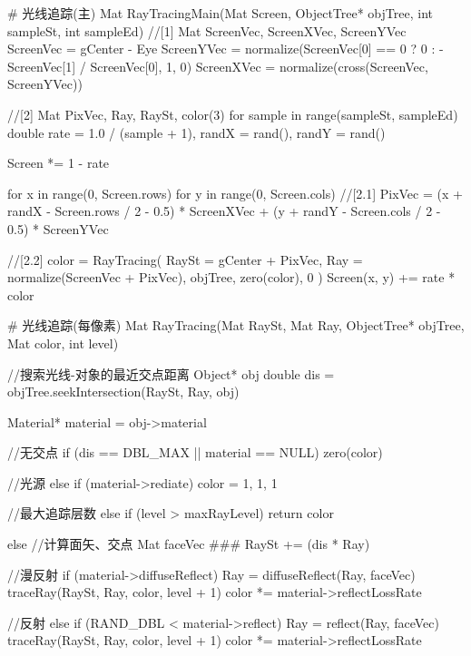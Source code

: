 						\Codes
							# 光线追踪(主)
							Mat RayTracingMain(Mat Screen, ObjectTree* objTree, int sampleSt, int sampleEd)
								//[1]
								Mat ScreenVec, ScreenXVec, ScreenYVec
								ScreenVec = gCenter - Eye
								ScreenYVec = normalize({ScreenVec[0] == 0 ? 0 : -ScreenVec[1] / ScreenVec[0], 1, 0})
								ScreenXVec = normalize(cross(ScreenVec, ScreenYVec))

								//[2]
								Mat PixVec, Ray, RaySt, color(3)
								for sample in range(sampleSt, sampleEd)
									double rate = 1.0 / (sample + 1), randX = rand(), randY = rand()

									Screen *= 1 - rate

									for x in range(0, Screen.rows)
										for y in range(0, Screen.cols)
											//[2.1]
											PixVec 
												= (x + randX - Screen.rows / 2 - 0.5) * ScreenXVec 
												+ (y + randY - Screen.cols / 2 - 0.5) * ScreenYVec

											//[2.2]
											color = RayTracing(
												RaySt = gCenter + PixVec, 
												Ray = normalize(ScreenVec + PixVec), 
												objTree, zero(color), 0
											) 
											Screen(x, y) += rate * color

							# 光线追踪(每像素)
							Mat RayTracing(Mat RaySt, Mat Ray, ObjectTree* objTree, Mat color, int level) 

								//搜索光线-对象的最近交点距离
								Object* obj
								double dis = objTree.seekIntersection(RaySt, Ray, obj) 
							
								Material* material = obj->material
							
								//无交点
								if (dis == DBL_MAX || material == NULL) 
									zero(color)
							
								//光源
								else if (material->rediate)
									color = {1, 1, 1}
							
								//最大追踪层数
								else if (level > maxRayLevel) 
									return color
							
								else 
									//计算面矢、交点
									Mat faceVec ###
									RaySt += (dis * Ray)
							
									//漫反射
									if (material->diffuseReflect)
										Ray = diffuseReflect(Ray, faceVec)
										traceRay(RaySt, Ray, color, level + 1)
										color *= material->reflectLossRate
									
									//反射
									else if (RAND_DBL < material->reflect)
										Ray = reflect(Ray, faceVec)
										traceRay(RaySt, Ray, color, level + 1)
										color *= material->reflectLossRate
									
